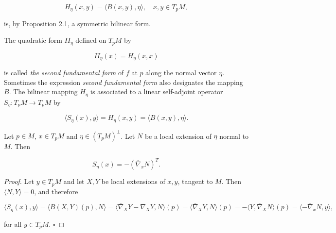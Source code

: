 $$
H_\eta(x,y)=\langle B(x,y),\eta\rangle,\quad x,y\in T_pM,
$$

is, by Proposition 2.1, a symmetric bilinear form.

\begin{definition}
  \label{def:dc-ch6-2-2}
  \leanok
  The quadratic form $\mathit{II}_\eta$ defined on $T_pM$ by
  
  $$
  \mathit{II}_\eta(x)=H_\eta(x,x)
  $$
  
  is called \emph{the second fundamental form} of $f$ at $p$ along the normal vector
  $\eta$. Sometimes the expression \emph{second fundamental form} also designates the
  mapping $B$. The bilinear mapping $H_\eta$ is associated to a linear self-adjoint
  operator $S_\eta:T_pM\to T_pM$ by
  
  $$
  \langle S_\eta(x),y\rangle=H_\eta(x,y)=\langle B(x,y),\eta\rangle.
  $$
\end{definition}

\begin{proposition}
  \label{prop:dc-ch6-2-3}
  \leanok
  Let $p\in M$, $x\in T_pM$ and $\eta\in(T_pM)^\perp$. Let $N$ be a local extension
  of $\eta$ normal to $M$. Then

  $$
  S_\eta(x)=-(\overline{\nabla}_x N)^T.
  $$
\end{proposition}
\begin{proof}
  \leanok
  Let $y\in T_pM$ and let $X,Y$ be local extensions of $x,y$, tangent to
  $M$. Then $\langle N,Y\rangle=0$, and therefore
  
  $$
  \langle S_\eta(x),y\rangle=\langle B(X,Y)(p),N\rangle=\langle\overline{\nabla}_X Y-\nabla_X Y,N\rangle(p)=\langle\overline{\nabla}_X Y,N\rangle(p)=-\langle Y,\overline{\nabla}_X N\rangle(p)=\langle-\overline{\nabla}_x N,y\rangle,
  $$
  
  for all $y\in T_pM$. $\square$
\end{proof}

